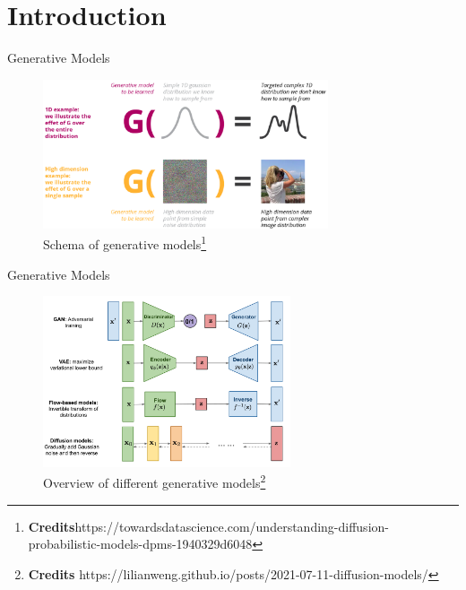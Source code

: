 \documentclass[aspectratio=169, 10pt]{beamer}
\theoremstyle{definition}
\begin{document}
\section{Introduction}
\begin{frame}{Generative Models}
  \begin{figure}[h!]
    \centering
    \includegraphics[width=0.75\textwidth]{./pic/generative-models-introa.png}
    \caption{Schema of generative
    models\footnote{\textbf{Credits}https://towardsdatascience.com/understanding-diffusion-probabilistic-models-dpms-1940329d6048}}
  \end{figure}
\end{frame}
\begin{frame}{Generative Models}
  \begin{figure}[h]
    \centering
    \includegraphics[width=0.65\textwidth]{./pic/generative-overview.png}
    \caption{Overview of different generative
    models\footnote{\textbf{Credits}
  https://lilianweng.github.io/posts/2021-07-11-diffusion-models/}}
  \end{figure}
\end{frame}
\end{document}
